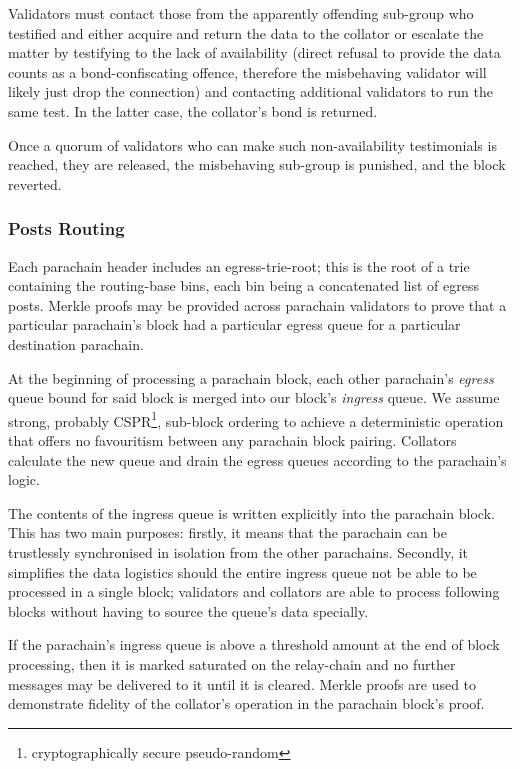 \documentclass[9pt,oneside]{amsart}
\begin{document}
\begin{multicols}{2}
 Validators must contact those from the apparently offending sub-group who testified and either acquire and return the data to the collator or escalate the matter by testifying to the lack of availability (direct refusal to provide the data counts as a bond-confiscating offence, therefore the misbehaving validator will likely just drop the connection) and contacting additional validators to run the same test. In the latter case, the collator's bond is returned.

 Once a quorum of validators who can make such non-availability testimonials is reached, they are released, the misbehaving sub-group is punished, and the block reverted.

\subsubsection{Posts Routing}
\label{posts-routing}

 Each parachain header includes an egress-trie-root; this is the root of a trie containing the routing-base bins, each bin being a concatenated list of egress posts. Merkle proofs may be provided across parachain validators to prove that a particular parachain's block had a particular egress queue for a particular destination parachain.

 At the beginning of processing a parachain block, each other parachain's \textit{egress} queue bound for said block is merged into our block's \textit{ingress} queue. We assume strong, probably CSPR\footnote{cryptographically secure pseudo-random}, sub-block ordering to achieve a deterministic operation that offers no favouritism between any parachain block pairing. Collators calculate the new queue and drain the egress queues according to the parachain's logic.

 The contents of the ingress queue is written explicitly into the parachain block. This has two main purposes: firstly, it means that the parachain can be trustlessly synchronised in isolation from the other parachains. Secondly, it simplifies the data logistics should the entire ingress queue not be able to be processed in a single block; validators and collators are able to process following blocks without having to source the queue's data specially.

 If the parachain's ingress queue is above a threshold amount at the end of block processing, then it is marked saturated on the relay-chain and no further messages may be delivered to it until it is cleared. Merkle proofs are used to demonstrate fidelity of the collator's operation in the parachain block's proof.


\end{multicols}
\end{document}
